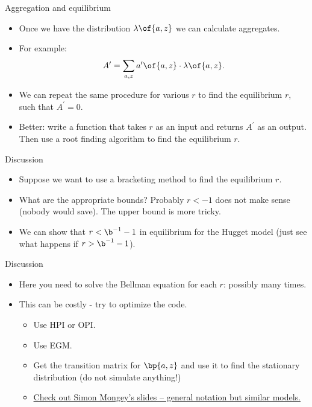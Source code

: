 \documentclass[11pt,xcolor={dvipsnames},aspectratio=159,hyperref={pdftex,pdfpagemode=UseNone,hidelinks,pdfdisplaydoctitle=true},usepdftitle=false]{beamer}
\begin{document}
\begin{frame}{Aggregation and equilibrium}   
    \begin{itemize}
        \item Once we have the distribution $\lambda\of{a,z}$ we can calculate aggregates.
        \item For example: \begin{align*}
            A^\prime = \sum_{a,z} a^\prime\of{a,z} \cdot \lambda\of{a,z}.
        \end{align*}
        \item We can repeat the same procedure for various $r$ to find the equilibrium $r$, such that $A^\prime=0$.
        \item Better: write a function that takes $r$ as an input and returns $A^\prime$ as an output. Then use a root finding algorithm to find the equilibrium $r$.
    \end{itemize}
    \end{frame}

    \begin{frame}{Discussion}   
        \begin{itemize}
            \item Suppose we want to use a bracketing method to find the equilibrium $r$. 
            \item What are the appropriate bounds? Probably $r<-1$ does not make sense (nobody would save). The upper bound is more tricky.
            \item We can show that $r<\b^{-1}-1$ in equilibrium for the Hugget model (just see what happens if $r>\b^{-1}-1$).
        \end{itemize}
        \end{frame}

    \begin{frame}{Discussion}   
        \begin{itemize}
            \item Here you need to solve the Bellman equation for each $r$: possibly many times. 
            \item This can be costly - try to optimize the code. 
            \begin{itemize}
                \item Use HPI or OPI.
                \item Use EGM.
                \item Get the transition matrix for $\bp{a,z}$ and use it to find the stationary distribution (do not simulate anything!)
                \item \href{https://www.simonmongey.com/uploads/6/5/6/6/65665741/lecture_-_quantitative_macroeconomics_-_mongey.pdf}{Check out Simon Mongey's slides -- general notation but similar models.}
            \end{itemize}
        \end{itemize}
        \end{frame}
\end{document}
